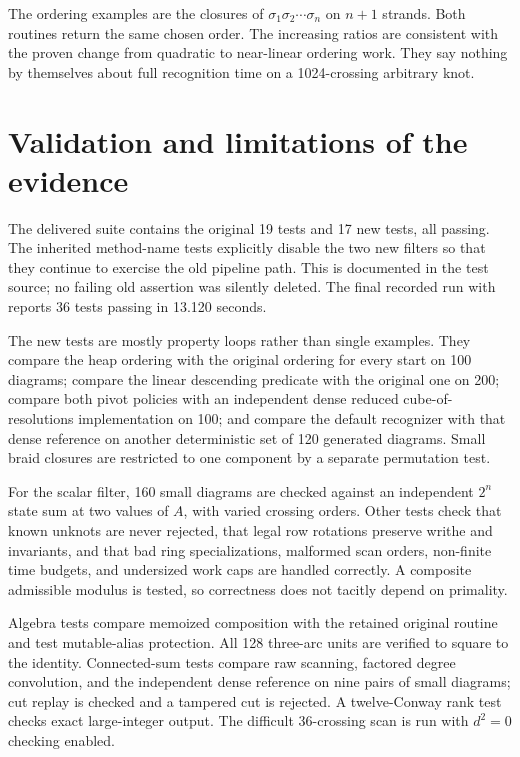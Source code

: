 \documentclass[11pt]{article}
\theoremstyle{definition}\newtheorem{definition}[theorem]{Definition}
\theoremstyle{remark}\newtheorem{remark}[theorem]{Remark}
\newcommand{\code}[1]{\texttt{\detokenize{#1}}}
\begin{document}
The ordering examples are the closures of
$\sigma_1\sigma_2\cdots\sigma_n$ on $n+1$ strands. Both routines return the
same chosen order. The increasing ratios are consistent with the proven
change from quadratic to near-linear ordering work. They say nothing by
themselves about full recognition time on a 1024-crossing arbitrary knot.

\section{Validation and limitations of the evidence}
\label{sec:validation}

The delivered suite contains the original 19 tests and 17 new tests, all
passing. The inherited method-name tests explicitly disable the two new
filters so that they continue to exercise the old pipeline path. This is
documented in the test source; no failing old assertion was silently deleted.
The final recorded run with \code{PYTHONHASHSEED=0} reports 36 tests passing
in 13.120 seconds.

The new tests are mostly property loops rather than single examples. They
compare the heap ordering with the original ordering for every start on 100
diagrams; compare the linear descending predicate with the original one on
200; compare both pivot policies with an independent dense reduced
cube-of-resolutions implementation on 100; and compare the default recognizer
with that dense reference on another deterministic set of 120 generated
diagrams. Small braid closures are restricted to one component by a separate
permutation test.

For the scalar filter, 160 small diagrams are checked against an independent
$2^n$ state sum at two values of $A$, with varied crossing orders. Other tests
check that known unknots are never rejected, that legal row rotations preserve
writhe and invariants, and that bad ring specializations, malformed scan
orders, non-finite time budgets, and undersized work caps are handled
correctly. A composite admissible modulus is tested, so correctness does
not tacitly depend on primality.

Algebra tests compare memoized composition with the retained original
routine and test mutable-alias protection. All 128 three-arc units are
verified to square to the identity. Connected-sum tests compare raw scanning,
factored degree convolution, and the independent dense reference on nine
pairs of small diagrams; cut replay is checked and a tampered cut is rejected.
A twelve-Conway rank test checks exact large-integer output. The difficult
36-crossing scan is run with $d^2=0$ checking enabled.
\end{document}
